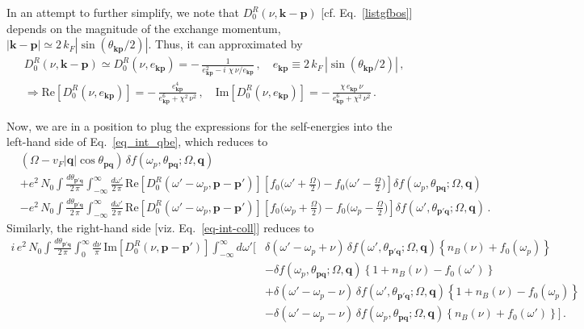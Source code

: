 \documentclass[aps, prb, onecolumn, nofootinbib, citeautoscript, 10pt]{revtex4-2}
\def \nn{\nonumber \\}
\newcommand{\bk}{\mathbf{k}}
\newcommand{\bp}{\mathbf{p}}
\newcommand{\bq}{\mathbf{q}}
\begin{document}
In an attempt to further simplify, we note that $D_0^R(\nu, \bk-\bp)$ [cf. Eq.~\eqref{listgfbos}] depends on the magnitude of the exchange momentum, $|\bk-\bp| \simeq  2 \, k_F |\sin (\theta_{\bk\bp}/2)|$. Thus, it can approximated by
\begin{align}
	& D_{0}^{R}(\nu,\bk-\bp) 
	\simeq D_{0}^{R}(\nu, e_{\bk \bp}) 
	= -\, \frac{1}{ e_{\bk \bp}^2- i \, \, \chi \, {\nu} / e_{\bk \bp}}\,,
	\quad
	e_{\bk \bp} \equiv  2 \, k_F \,|\sin ( {\theta_{\bk\bp}}/ 2 )|\,,\nn
	& \Rightarrow
	\text{Re} [D_{0}^R(\nu, e_{\bk \bp})] =
	- \, \frac{e_{\bk \bp}^4} {e_{\bk \bp}^6  +  \chi^2 \,\nu^2} \,,\quad 
	\text{Im} [D_{0}^R(\nu,  e_{\bk \bp})]
	= -\, \frac{ \chi  \, e_{\bk \bp}\, \nu} 
	{e_{\bk \bp}^6  +  \chi^2 \,\nu^2}\,.
\label{reimD}
\end{align}

Now, we are in a position to plug the expressions for the self-energies into the left-hand side of Eq.~\eqref{eq_int_qbe}, which reduces to
\begin{align}
	\label{eqlhs}  
	& (\Omega-v_F |\bq| \cos\theta_{\bp \bq}) \, \delta f ( \omega_p, \theta_{\bp \bq}; \Omega, \bq) 
	\nn & 
	+ e^2 \, N_0 \int \frac{ d\theta_{\bp'\bq}}{ 2 \, \pi }
	\int_{-\infty}^{\infty} \frac{d\omega'} { 2 \, \pi } \,
	\text{Re} [ D^R_0( \omega'-\omega_p, \bp-\bp') ] 
	\left[ f_0 \Big (\omega'  +  \frac{\Omega}{2} \Big ) 
	- f_0 \Big (\omega'-\frac{\Omega}{2} \Big) \right]
	\delta f ( \omega_p , \theta_{\bp \bq}; \Omega, \bq) 
	\nn &  
	- e^2 \, N_0 \int \frac{d\theta_{\bp'\bq}}{ 2 \, \pi }
	\int_{-\infty}^{\infty} \frac{d\omega'}{ 2 \, \pi } \,
	\text{Re} [D^R_0( \omega'-\omega_p, \bp-\bp') ]
	\left[ f_0 \Big (\omega_p  +  \frac{\Omega}{2} \Big) -f_0 \Big (\omega_p - \frac{\Omega}{2} \Big )\right] 
	\delta f( \omega', \theta_{\bp'\bq} ;  \Omega, \bq )\,. 
\end{align}
Similarly, the right-hand side [viz. Eq.~\eqref{eq-int-coll}] reduces to
\begin{align}
	\label{eqrhs}   
	i \, e^2 \, N_0 \int \frac{d\theta_{\bp'\bq}} { 2 \, \pi } \int_{0}^{\infty}
	\frac{d\nu}{\pi}\, \text{Im} [D_0^R( \nu , \bp-\bp')]
	\int_{-\infty}^{\infty} d\omega' 
	\Big [ &
	\delta(\omega'-\omega_p +  \nu) \,
	\delta f( \omega', \theta_{\bp'\bq};  \Omega, \bq ) 
	\left \lbrace n_B(\nu)  + f_0(\omega_p) \right \rbrace
	\nn & 
	- \delta f ( \omega_p , \theta_{\bp \bq}; \Omega, \bq)
	\left \lbrace 1 + n_B(\nu)-f_0(\omega') \right \rbrace
	\nn &
	+  \delta(\omega'-\omega_p - \nu) 
	\, \delta f( \omega', \theta_{\bp'\bq};  \Omega, \bq )
	\left \lbrace  1 + n_B(\nu)-f_0(\omega_p) \right \rbrace
	\nn &   
	-  \delta(\omega'-\omega_p - \nu) \, 
	\delta f ( \omega_p, \theta_{\bp \bq}; \Omega, \bq)
	\left \lbrace  n_B(\nu) + f_0(\omega') \right \rbrace  \Big ]\,.
\end{align}



\end{document}

